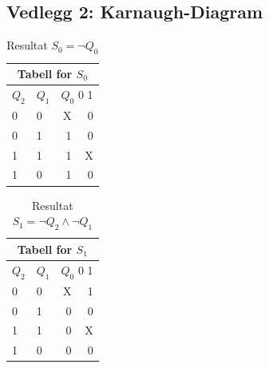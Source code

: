 \documentclass[12pt,norsk,a4paper]{article}
\begin{document}
    \subsection{Vedlegg 2: Karnaugh-Diagram}
    \begin{table}[H]
    \begin{center}
    \begin{tabular}{|l|l|r|r|} \hline
    \multicolumn{4}{|c|}{Tabell for $S_0$} \\ \hline
    $Q_2$ & $Q_1$ & \multicolumn{2}{|r|}{$Q_0$ \hspace{20 mm} 0 \hspace{2 mm} 1} \\ \hline
    0 & 0 & \hspace{27 mm} X \cellcolor[gray]{0.8} & 0 \\ \hline 
    0 & 1 & 1 \cellcolor[gray]{0.8} & 0 \\ \hline
    1 & 1 & 1 \cellcolor[gray]{0.8} & X \\ \hline
    1 & 0 & 1 \cellcolor[gray]{0.8} & 0 \\ \hline
    \end{tabular}
    \end{center}
    \label{juul}
    \caption{Resultat $S_0=\neg Q_0$}
    \end{table}

    \begin{table}[H]
    \begin{center}
    \begin{tabular}{|l|l|r|r|} \hline
    \multicolumn{4}{|c|}{Tabell for $S_1$} \\ \hline
    $Q_2$ & $Q_1$ & \multicolumn{2}{|r|}{$Q_0$ \hspace{20 mm} 0 \hspace{2 mm} 1} \\ \hline
    0 & 0 & \hspace{27 mm} X \cellcolor[gray]{0.8} & \cellcolor[gray]{0.8} 1 \\ \hline 
    0 & 1 & 0 & 0 \\ \hline
    1 & 1 & 0 & X \\ \hline
    1 & 0 & 0 & 0 \\ \hline
    \end{tabular}
    \end{center}
    \caption{Resultat $S_1=\neg Q_2 \wedge \neg Q_1$}
    \end{table}
\end{document}
